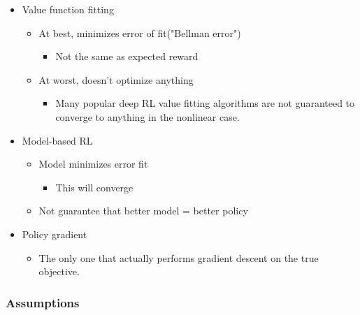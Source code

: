 \documentclass[]{article}
\begin{document}
\begin{itemize}
    \item Value function fitting
        \begin{itemize}
            \item At best, minimizes error of fit("Bellman error") 
                \begin{itemize}
                    \item Not the same as expected reward
                \end{itemize}
            \item At worst, doesn't optimize anything
                \begin{itemize}
                    \item Many popular deep RL value fitting algorithms are not guaranteed to converge to
                        anything in the nonlinear case.
                \end{itemize}
        \end{itemize}
    \item Model-based RL
        \begin{itemize}
            \item Model minimizes error fit
                \begin{itemize}
                    \item This will converge
                \end{itemize}
            \item Not guarantee that better model = better policy
        \end{itemize}
    \item Policy gradient
        \begin{itemize}
            \item The only one that actually performs gradient descent on the true objective.
        \end{itemize}
\end{itemize}

\subsubsection*{Assumptions}
\label{sub:Assumptions}
\end{document}
